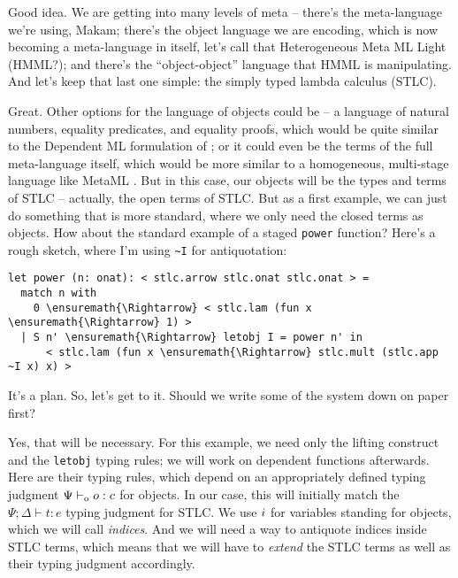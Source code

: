 \heroADVISOR{} Good idea. We are getting into many levels of meta -- there's
the meta-language we're using, Makam; there's the object language we are
encoding, which is now becoming a meta-language in itself, let's call
that Heterogeneous Meta ML Light (HMML?); and there's the
``object-object'' language that HMML is manipulating. And let's keep
that last one simple: the simply typed lambda calculus (STLC).

\heroSTUDENT{} Great. Other options for the language of objects could be -- a
language of natural numbers, equality predicates, and equality proofs,
which would be quite similar to the Dependent ML formulation of
\citet{licata2005formulation}; or it could even be the terms of the full
meta-language itself, which would be more similar to a homogeneous,
multi-stage language like MetaML \citep{metaml-main-reference}. But in
this case, our objects will be the types and terms of STLC -- actually,
the open terms of STLC. But as a first example, we can just do something
that is more standard, where we only need the closed terms as objects.
How about the standard example of a staged \texttt{power} function?
Here's a rough sketch, where I'm using \texttt{\textasciitilde{}I} for
antiquotation:

\begin{verbatim}
let power (n: onat): < stlc.arrow stlc.onat stlc.onat > =
  match n with
    0 \ensuremath{\Rightarrow} < stlc.lam (fun x \ensuremath{\Rightarrow} 1) >
  | S n' \ensuremath{\Rightarrow} letobj I = power n' in
      < stlc.lam (fun x \ensuremath{\Rightarrow} stlc.mult (stlc.app ~I x) x) >
\end{verbatim}

\heroADVISOR{} It's a plan. So, let's get to it. Should we write some of the
system down on paper first?

\heroSTUDENT{} Yes, that will be necessary. For this example, we need only the
lifting construct and the \texttt{letobj} typing rules; we will work on
dependent functions afterwards. Here are their typing rules, which
depend on an appropriately defined typing judgment \(\Psi \vdash_{\text{o}} o : c\)
for objects. In our case, this will initially match the
\(\Psi; \Delta \vdash t : e\) typing judgment for STLC. We use
\(i\) for variables standing for objects, which we will call
\emph{indices}. And we will need a way to antiquote indices inside STLC
terms, which means that we will have to \emph{extend} the STLC terms as
well as their typing judgment accordingly.

\newcommand\stlce[0]{\hat{e}}
\newcommand\stlct[0]{\hat{t}}

